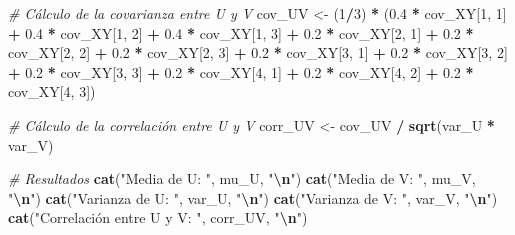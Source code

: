 \documentclass[
]{article}
\newenvironment{Shaded}{\begin{snugshade}}{\end{snugshade}}
\newcommand{\CommentTok}[1]{\textcolor[rgb]{0.56,0.35,0.01}{\textit{#1}}}
\newcommand{\DecValTok}[1]{\textcolor[rgb]{0.00,0.00,0.81}{#1}}
\newcommand{\FloatTok}[1]{\textcolor[rgb]{0.00,0.00,0.81}{#1}}
\newcommand{\FunctionTok}[1]{\textcolor[rgb]{0.13,0.29,0.53}{\textbf{#1}}}
\newcommand{\NormalTok}[1]{#1}
\newcommand{\OtherTok}[1]{\textcolor[rgb]{0.56,0.35,0.01}{#1}}
\newcommand{\SpecialCharTok}[1]{\textcolor[rgb]{0.81,0.36,0.00}{\textbf{#1}}}
\newcommand{\StringTok}[1]{\textcolor[rgb]{0.31,0.60,0.02}{#1}}
\begin{document}
\begin{Shaded}
\begin{Highlighting}[]
\CommentTok{\# Cálculo de la covarianza entre U y V}
\NormalTok{cov\_UV }\OtherTok{\textless{}{-}}\NormalTok{ (}\DecValTok{1}\SpecialCharTok{/}\DecValTok{3}\NormalTok{) }\SpecialCharTok{*}\NormalTok{ (}\FloatTok{0.4} \SpecialCharTok{*}\NormalTok{ cov\_XY[}\DecValTok{1}\NormalTok{, }\DecValTok{1}\NormalTok{] }\SpecialCharTok{+} \FloatTok{0.4} \SpecialCharTok{*}\NormalTok{ cov\_XY[}\DecValTok{1}\NormalTok{, }\DecValTok{2}\NormalTok{] }\SpecialCharTok{+} \FloatTok{0.4} \SpecialCharTok{*}\NormalTok{ cov\_XY[}\DecValTok{1}\NormalTok{, }\DecValTok{3}\NormalTok{] }\SpecialCharTok{+}
                  \FloatTok{0.2} \SpecialCharTok{*}\NormalTok{ cov\_XY[}\DecValTok{2}\NormalTok{, }\DecValTok{1}\NormalTok{] }\SpecialCharTok{+} \FloatTok{0.2} \SpecialCharTok{*}\NormalTok{ cov\_XY[}\DecValTok{2}\NormalTok{, }\DecValTok{2}\NormalTok{] }\SpecialCharTok{+} \FloatTok{0.2} \SpecialCharTok{*}\NormalTok{ cov\_XY[}\DecValTok{2}\NormalTok{, }\DecValTok{3}\NormalTok{] }\SpecialCharTok{+}
                  \FloatTok{0.2} \SpecialCharTok{*}\NormalTok{ cov\_XY[}\DecValTok{3}\NormalTok{, }\DecValTok{1}\NormalTok{] }\SpecialCharTok{+} \FloatTok{0.2} \SpecialCharTok{*}\NormalTok{ cov\_XY[}\DecValTok{3}\NormalTok{, }\DecValTok{2}\NormalTok{] }\SpecialCharTok{+} \FloatTok{0.2} \SpecialCharTok{*}\NormalTok{ cov\_XY[}\DecValTok{3}\NormalTok{, }\DecValTok{3}\NormalTok{] }\SpecialCharTok{+}
                  \FloatTok{0.2} \SpecialCharTok{*}\NormalTok{ cov\_XY[}\DecValTok{4}\NormalTok{, }\DecValTok{1}\NormalTok{] }\SpecialCharTok{+} \FloatTok{0.2} \SpecialCharTok{*}\NormalTok{ cov\_XY[}\DecValTok{4}\NormalTok{, }\DecValTok{2}\NormalTok{] }\SpecialCharTok{+} \FloatTok{0.2} \SpecialCharTok{*}\NormalTok{ cov\_XY[}\DecValTok{4}\NormalTok{, }\DecValTok{3}\NormalTok{])}

\CommentTok{\# Cálculo de la correlación entre U y V}
\NormalTok{corr\_UV }\OtherTok{\textless{}{-}}\NormalTok{ cov\_UV }\SpecialCharTok{/} \FunctionTok{sqrt}\NormalTok{(var\_U }\SpecialCharTok{*}\NormalTok{ var\_V)}

\CommentTok{\# Resultados}
\FunctionTok{cat}\NormalTok{(}\StringTok{"Media de U: "}\NormalTok{, mu\_U, }\StringTok{"}\SpecialCharTok{\textbackslash{}n}\StringTok{"}\NormalTok{)}
\FunctionTok{cat}\NormalTok{(}\StringTok{"Media de V: "}\NormalTok{, mu\_V, }\StringTok{"}\SpecialCharTok{\textbackslash{}n}\StringTok{"}\NormalTok{)}
\FunctionTok{cat}\NormalTok{(}\StringTok{"Varianza de U: "}\NormalTok{, var\_U, }\StringTok{"}\SpecialCharTok{\textbackslash{}n}\StringTok{"}\NormalTok{)}
\FunctionTok{cat}\NormalTok{(}\StringTok{"Varianza de V: "}\NormalTok{, var\_V, }\StringTok{"}\SpecialCharTok{\textbackslash{}n}\StringTok{"}\NormalTok{)}
\FunctionTok{cat}\NormalTok{(}\StringTok{"Correlación entre U y V: "}\NormalTok{, corr\_UV, }\StringTok{"}\SpecialCharTok{\textbackslash{}n}\StringTok{"}\NormalTok{)}
\end{Highlighting}
\end{Shaded}
\end{document}
